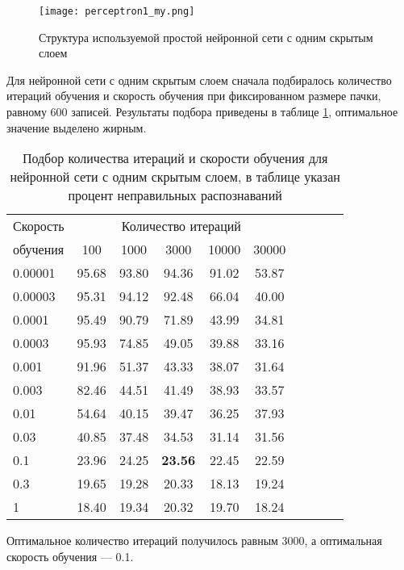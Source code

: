 \begin{figure}[h]
	\centering
	\texttt{[image: perceptron1\_my.png]}
	\caption{Структура используемой простой нейронной сети с одним скрытым слоем}
	\label{fig:perceptron1_my}
\end{figure}

Для нейронной сети с одним скрытым слоем сначала подбиралось количество итераций обучения и скорость обучения при фиксированном размере пачки, равному 600 записей.
Результаты подбора приведены в таблице \ref{tab:mlp1_bf_iter_pace}, оптимальное значение выделено жирным.

\begin{table}[h]
	\centering
	\caption{Подбор количества итераций и скорости обучения для нейронной сети с одним скрытым слоем, в таблице указан процент неправильных распознаваний}
	\label{tab:mlp1_bf_iter_pace}
	\begin{tabular}{| l | c | c | c | c | c | c | c | c | c |}
		\hline
		Скорость & \multicolumn{5}{c|}{Количество итераций} \\
		\hhline{~---------}
		обучения \phantom{00} & \phantom{000} 100 \phantom{000} & \phantom{000}1000\phantom{000} & \phantom{000}3000\phantom{000} & \phantom{00} 10000 \phantom{00} & \phantom{00} 30000 \phantom{00} \\
		\hline
		0.00001  & 95.68 & 93.80 & 94.36 & 91.02 & 53.87 \\
		0.00003  & 95.31 & 94.12 & 92.48 & 66.04 & 40.00 \\
		0.0001	 & 95.49 & 90.79 & 71.89 & 43.99 & 34.81 \\
		0.0003	 & 95.93 & 74.85 & 49.05 & 39.88 & 33.16 \\
		0.001  	 & 91.96 & 51.37 & 43.33 & 38.07 & 31.64 \\
		0.003 	 & 82.46 & 44.51 & 41.49 & 38.93 & 33.57 \\
		0.01 	 & 54.64 & 40.15 & 39.47 & 36.25 & 37.93 \\
		0.03 	 & 40.85 & 37.48 & 34.53 & 31.14 & 31.56 \\
		0.1 	 & 23.96 & 24.25 & \textbf{23.56} & 22.45 & 22.59 \\
		0.3 	 & 19.65 & 19.28 & 20.33 & 18.13 & 19.24 \\
		1 		 & 18.40 & 19.34 & 20.32 & 19.70 & 18.24 \\
		\hline
	\end{tabular}
\end{table}
Оптимальное количество итераций получилось равным 3000, а оптимальная скорость обучения --- 0.1.

